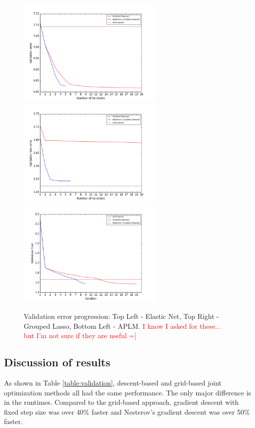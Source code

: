 \documentclass[10pt,letterpaper]{article}
\begin{document}
\begin{figure} 
\includegraphics[width=70mm]{elasticnet_costpath_80_250_15.png}
\includegraphics[width=70mm]{grouped_lasso_60_1500_3_150.png}
\includegraphics[width=70mm]{smooth_linear_simple_cost_path_1_100_20_6.png}
\caption{Validation error progression: Top Left - Elastic Net, Top Right - Grouped Lasso, Bottom Left - APLM. \textcolor{red}{I know I asked for these... but I'm not sure if they are useful =]}}
\label{figure:costpath}
\end{figure}

\subsection{Discussion of results}

As shown in Table \ref{table:validation}, descent-based and grid-based joint optimization methods all had the same performance. The only major difference is in the runtimes. Compared to the grid-based approach, gradient descent with fixed step size was over 40\% faster and Nesterov's gradient descent was over 50\% faster.
\end{document}
